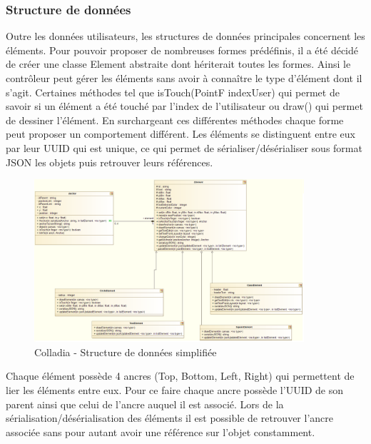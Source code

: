 \subsubsection{Structure de données}
Outre les données utilisateurs, les structures de données principales concernent les éléments. Pour pouvoir proposer de nombreuses formes prédéfinis, il a été décidé de créer une classe Element abstraite dont hériterait toutes les formes. Ainsi le contrôleur peut gérer les éléments sans avoir à connaître le type d'élément dont il s'agit.
Certaines méthodes tel que isTouch(PointF indexUser) qui permet de savoir si un élément a été touché par l'index de l'utilisateur ou draw() qui permet de dessiner l'élément. En surchargeant ces différentes méthodes chaque forme peut proposer un comportement différent.
Les éléments se distinguent entre eux par leur UUID qui est unique, ce qui permet de sérialiser/désérialiser sous format JSON les objets puis retrouver leurs références. 
	\begin{figure}[!h]
		\centering
		\includegraphics[width=10cm]{img/UmlArchiStructureData}
		\caption{Colladia - Structure de données simplifiée}
	\end{figure}
Chaque élément possède 4 ancres (Top, Bottom, Left, Right) qui permettent de lier les éléments entre eux. Pour ce faire chaque ancre possède l'UUID de son parent ainsi que celui de l'ancre auquel il est associé. Lors de la sérialisation/désérialisation des éléments il est possible de retrouver l'ancre associée sans pour autant avoir une référence sur l'objet constamment.

